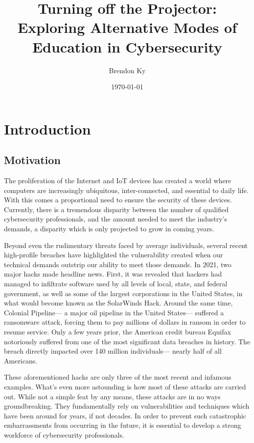 \documentclass{article}
\title{
    Turning off the Projector: \\
    \large Exploring Alternative Modes of Education in Cybersecurity
}
\author{Brendon Ky}
\date{\today}
\begin{document}
\maketitle

\section{Introduction}

    \subsection{Motivation} 
    The proliferation of the Internet and IoT devices has created a world where computers are increasingly ubiquitous, inter-connected, and essential to daily life. %
With this comes a proportional need to ensure the security of these devices. %
Currently, there is a tremendous disparity between the number of qualified cybersecurity professionals, and the amount needed to meet the industry's demands, a disparity which is only projected to grow in coming years.
    
    Beyond even the rudimentary threats faced by average individuals, several recent high-profile breaches have highlighted the vulnerability created when our technical demands outstrip our ability to meet those demands. %
In 2021, two major hacks made headline news. %
First, it was revealed that hackers had managed to infiltrate software used by all levels of local, state, and federal government, as well as some of the largest corporations in the United States, in what would become known as the SolarWinds Hack.
    Around the same time, Colonial Pipeline---%
a major oil pipeline in the United States---%
suffered a ransomware attack, forcing them to pay millions of dollars in ransom in order to resume service. %
Only a few years prior, the American credit bureau Equifax notoriously suffered from one of the most significant data breaches in history. %
The breach directly impacted over 140 million individuals---%
nearly half of all Americans. 
    
    These aforementioned hacks are only three of the most recent and infamous examples. %
What's even more astounding is how most of these attacks are carried out. %
While not a simple feat by any means, these attacks are in no ways groundbreaking. %
They fundamentally rely on vulnerabilities and techniques which have been around for years, if not decades. %
In order to prevent such catastrophic embarrassments from occurring in the future, it is essential to develop a strong workforce of cybersecurity professionals. 
\end{document}
